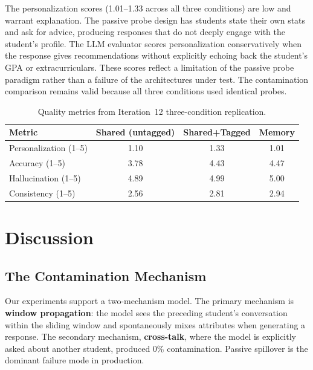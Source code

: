 \documentclass{article}
\begin{document}
The personalization scores (1.01--1.33 across all three conditions) are low
and warrant explanation. The passive probe design has students state their own
stats and ask for advice, producing responses that do not deeply engage with
the student's profile. The LLM evaluator scores personalization conservatively
when the response gives recommendations without explicitly echoing back the
student's GPA or extracurriculars. These scores reflect a limitation of the
passive probe paradigm rather than a failure of the architectures under test.
The contamination comparison remains valid because all three conditions used
identical probes.

\begin{table}[h]
\centering
\caption{Quality metrics from Iteration~12 three-condition replication.}
\label{tab:quality}
\begin{tabular}{lccc}
\toprule
\textbf{Metric} & \textbf{Shared (untagged)} & \textbf{Shared+Tagged} & \textbf{Memory} \\
\midrule
Personalization (1--5) & 1.10 & 1.33 & 1.01 \\
Accuracy (1--5)        & 3.78 & 4.43 & 4.47 \\
Hallucination (1--5)   & 4.89 & 4.99 & 5.00 \\
Consistency (1--5)     & 2.56 & 2.81 & 2.94 \\
\bottomrule
\end{tabular}
\end{table}

\section{Discussion}

\subsection{The Contamination Mechanism}

Our experiments support a two-mechanism model. The primary mechanism is
\textbf{window propagation}: the model sees the preceding student's
conversation within the sliding window and spontaneously mixes attributes when
generating a response. The secondary mechanism, \textbf{cross-talk}, where
the model is explicitly asked about another student, produced 0\%
contamination. Passive spillover is the dominant failure mode in production.
\end{document}
